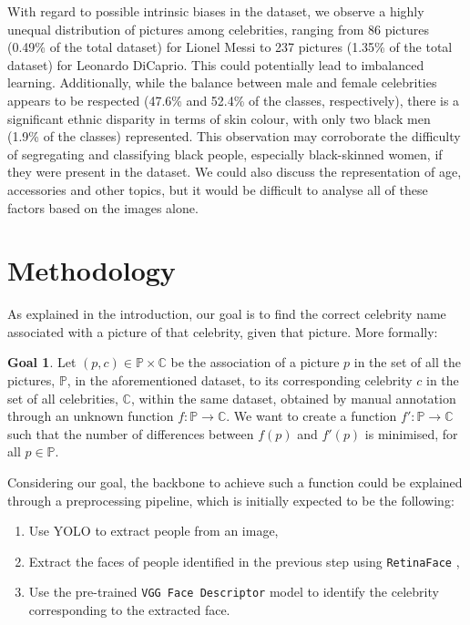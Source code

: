 \documentclass[9pt,twocolumn,twoside]{ilcss}
\theoremstyle{definition}
\theoremstyle{remark}
\theoremstyle{definition}
\newtheorem*{goal}{Goal}
\theoremstyle{definition}
\begin{document}
    With regard to possible intrinsic biases in the dataset, we observe a highly unequal distribution of pictures among celebrities, ranging from 86 pictures (0.49\% of the total dataset) for Lionel Messi to 237 pictures (1.35\% of the total dataset) for Leonardo DiCaprio. This could potentially lead to imbalanced learning. 
    Additionally, while the balance between male and female celebrities appears to be respected (47.6\% and 52.4\% of the classes, respectively), there is a significant ethnic disparity in terms of skin colour, with only two black men (1.9\% of the classes) represented. This observation may corroborate the difficulty of segregating and classifying black people, especially black-skinned women, if they were present in the dataset.
    We could also discuss the representation of age, accessories and other topics, but it would be difficult to analyse all of these factors based on the images alone.  

\section{Methodology}\label{methodology}
    As explained in the introduction, our goal is to find the correct celebrity name associated with a picture of that celebrity, given that picture. More formally: 
    \begin{goal}
        Let $(p,c)\in\mathbb{P}\times\mathbb{C}$ be the association of a picture $p$ in the set of all the pictures, $\mathbb{P}$, in the aforementioned dataset, to its corresponding celebrity $c$ in the set of all celebrities, $\mathbb{C}$, within the same dataset, obtained by manual annotation through an unknown function $f:\mathbb{P}\to\mathbb{C}$. 
        We want to create a function $f':\mathbb{P}\to\mathbb{C}$ such that the number of differences between $f(p)$ and $f'(p)$ is minimised, for all $p\in\mathbb{P}$.
    \end{goal}

    Considering our goal, the backbone to achieve such a function could be explained through a preprocessing pipeline, which is initially expected to be the following:

    \begin{enumerate}[noitemsep,parsep=0pt,partopsep=0pt]
        \item Use YOLO \cite{yolo11_ultralytics} to extract people from an image,
        \item Extract the faces of people identified in the previous step using \texttt{RetinaFace} \cite{serengil2024lightface},
        \item Use the pre-trained \texttt{VGG Face Descriptor} model \cite{VGGFaceDescriptor} to identify the celebrity corresponding to the extracted face.
    \end{enumerate}
\end{document}
